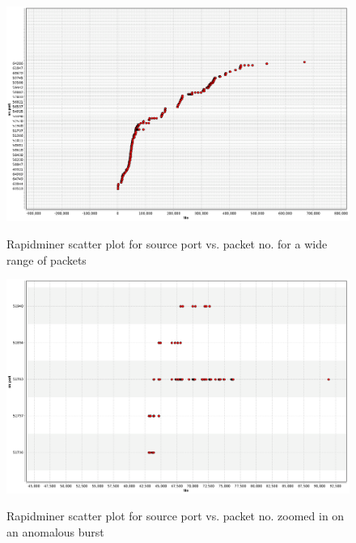\documentclass{article}
\begin{document}
\begin{figure}[H] 
	\centering %
	{\includegraphics[width=\textwidth]{images/ex2_scatter_src_no_49_2_wide.png}} %
	\caption{Rapidminer scatter plot for source port vs. packet no. for a wide range of packets} 
	\label{fig:RMscreen2} %
\end{figure} 
\begin{figure}[H] 
	\centering %
	{\includegraphics[width=\textwidth]{images/ex2_scatter_src_no_49_2_tight.png}} %
	\caption{Rapidminer scatter plot for source port vs. packet no. zoomed in on an anomalous burst} 
	\label{fig:RMscreen3} %
\end{figure} 


\newpage
\end{document}
